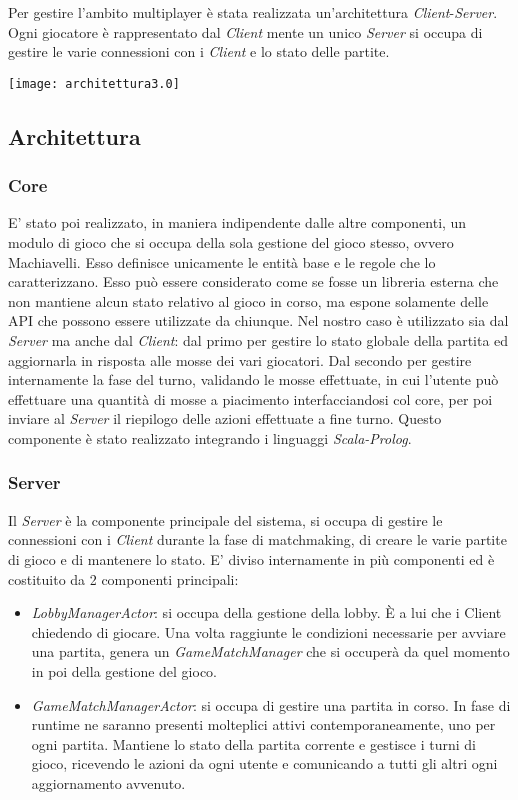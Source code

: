 Per gestire l'ambito multiplayer è stata realizzata un’architettura \textit{Client}-\textit{Server}.
Ogni giocatore è rappresentato dal \textit{Client} mente un unico \textit{Server} si occupa di gestire le varie connessioni con i \textit{Client} e lo stato delle partite.
\begin{center}
    \texttt{[image: architettura3.0]}
\end{center}
\subsection[Architettura]{Architettura}
\subsubsection{Core}
E’ stato poi realizzato, in maniera indipendente dalle altre componenti, un modulo di gioco che si occupa della sola gestione del gioco stesso, ovvero Machiavelli.
Esso definisce unicamente le entità base e le regole che lo caratterizzano.\newline \newline
Esso può essere considerato come se fosse un libreria esterna che non mantiene alcun stato relativo al gioco in corso, ma espone solamente delle API che possono essere utilizzate da chiunque. \newline \newline
Nel nostro caso è utilizzato sia dal \textit{Server} ma anche dal \textit{Client}: dal primo per gestire lo stato globale della partita ed aggiornarla in risposta alle mosse dei vari giocatori. Dal secondo per gestire internamente la fase del turno, validando le mosse effettuate, in cui l’utente può effettuare una quantità di mosse a piacimento interfacciandosi col core, per poi inviare al \textit{Server} il riepilogo delle azioni effettuate a fine turno.
Questo componente è stato realizzato integrando i linguaggi \textit{Scala-Prolog}.
\subsubsection{Server}
Il \textit{Server} è la componente principale del sistema, si occupa di gestire le connessioni con i \textit{Client} durante la fase di matchmaking, di creare le varie partite di gioco e di mantenere lo stato.
E’ diviso internamente in più componenti ed è costituito da 2 componenti principali:
\begin{itemize}
    \item \textit{LobbyManagerActor}: si occupa della gestione della lobby.
    È a lui che i Client chiedendo di giocare.
    Una volta raggiunte le condizioni necessarie per avviare una partita, genera un \textit{GameMatchManager} che si occuperà da quel momento in poi della gestione del gioco.
    \item \textit{GameMatchManagerActor}: si occupa di gestire una partita in corso.
    In fase di runtime ne saranno presenti molteplici attivi contemporaneamente, uno per ogni partita.
    Mantiene lo stato della partita corrente e gestisce i turni di gioco, ricevendo le azioni da ogni utente e comunicando a tutti gli altri ogni aggiornamento avvenuto.
\end{itemize}
